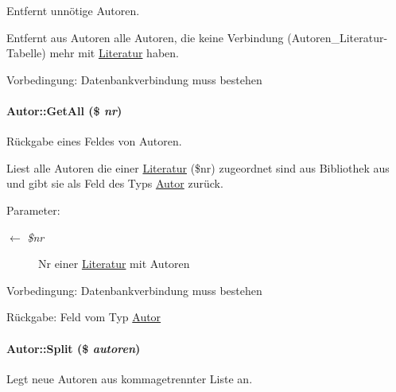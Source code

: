 Entfernt unnötige Autoren. 

Entfernt aus Autoren alle Autoren, die keine Verbindung (Autoren\_\-Literatur-Tabelle) mehr mit \hyperlink{classLiteratur}{Literatur} haben. \begin{Desc}
\item[Vorbedingung:]Datenbankverbindung muss bestehen \end{Desc}
\hypertarget{classAutor_073e31faa28a51d6992e6bed20326a07}{
\paragraph[GetAll]{\setlength{\rightskip}{0pt plus 5cm}Autor::Get\-All (\$ {\em nr})}\hfill}
\label{classAutor_073e31faa28a51d6992e6bed20326a07}


Rückgabe eines Feldes von Autoren. 

Liest alle Autoren die einer \hyperlink{classLiteratur}{Literatur} (\$nr) zugeordnet sind aus Bibliothek aus und gibt sie als Feld des Typs \hyperlink{classAutor}{Autor} zurück. \begin{Desc}
\item[Parameter:]
\begin{description}
\item[\mbox{$\leftarrow$} {\em \$nr}]Nr einer \hyperlink{classLiteratur}{Literatur} mit Autoren \end{description}
\end{Desc}
\begin{Desc}
\item[Vorbedingung:]Datenbankverbindung muss bestehen \end{Desc}
\begin{Desc}
\item[R\"{u}ckgabe:]Feld vom Typ \hyperlink{classAutor}{Autor}\end{Desc}
\hypertarget{classAutor_2ba5418b6622f414fa8a054e6c2a2db8}{
\paragraph[Split]{\setlength{\rightskip}{0pt plus 5cm}Autor::Split (\$ {\em autoren})}\hfill}
\label{classAutor_2ba5418b6622f414fa8a054e6c2a2db8}


Legt neue Autoren aus kommagetrennter Liste an. 


